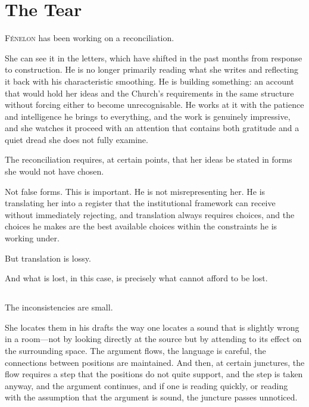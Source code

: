 
\chapter{The Tear}


\lettrine{F}{énelon} has been working on a reconciliation.

She can see it in the letters, which have shifted in the
past months from response to construction. He is no longer
primarily reading what she writes and reflecting it back
with his characteristic smoothing. He is building something:
an account that would hold her ideas and the Church's
requirements in the same structure without forcing either
to become unrecognisable. He works at it with the patience
and intelligence he brings to everything, and the work is
genuinely impressive, and she watches it proceed with an
attention that contains both gratitude and a quiet dread
she does not fully examine.

The reconciliation requires, at certain points, that her
ideas be stated in forms she would not have chosen.

Not false forms. This is important. He is not misrepresenting
her. He is translating her into a register that the
institutional framework can receive without immediately
rejecting, and translation always requires choices, and
the choices he makes are the best available choices within
the constraints he is working under.

But translation is lossy.

And what is lost, in this case, is precisely what cannot
afford to be lost.

\section{}

The inconsistencies are small.

She locates them in his drafts the way one locates a
sound that is slightly wrong in a room---not by looking
directly at the source but by attending to its effect
on the surrounding space. The argument flows, the
language is careful, the connections between positions
are maintained. And then, at certain junctures, the
flow requires a step that the positions do not quite
support, and the step is taken anyway, and the argument
continues, and if one is reading quickly, or reading
with the assumption that the argument is sound, the
juncture passes unnoticed.

